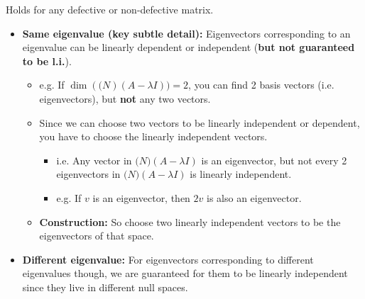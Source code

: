 \begin{warning}
    Holds for any defective or non-defective matrix. 
    \begin{itemize}
        \item \textbf{Same eigenvalue (key subtle detail):} Eigenvectors corresponding to an eigenvalue can be linearly dependent or independent (\textbf{but not guaranteed to be l.i.}). 
            \begin{itemize}
                \item e.g. If $\dim (\mathcal(N)(A-\lambda I)) = 2$, you can find 2 basis vectors (i.e. eigenvectors), but \textbf{not} any two vectors. 
                \item Since we can choose two vectors to be linearly independent or dependent, you have to choose the linearly independent vectors.
                \begin{itemize}
                    \item i.e. Any vector in $\mathcal(N)(A-\lambda I)$ is an eigenvector, but not every 2 eigenvectors in $\mathcal(N)(A-\lambda I)$ is linearly independent. 
                    \item e.g. If $v$ is an eigenvector, then $2v$ is also an eigenvector. 
                \end{itemize}
                \item \textbf{Construction:} So choose two linearly independent vectors to be the eigenvectors of that space. 
            \end{itemize}
        \item \textbf{Different eigenvalue:} For eigenvectors corresponding to different eigenvalues though, we are guaranteed for them to be linearly independent since they live in different null spaces. 
    \end{itemize}
\end{warning}


